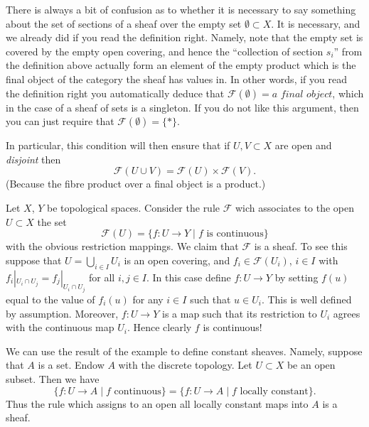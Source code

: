 \begin{remark}
\label{remark-confusion}
There is always a bit of confusion as to whether it is
necessary to say something about the set of sections of
a sheaf over the empty set $\emptyset \subset X$.
It is necessary, and we already did if you read the
definition right. Namely, note that the empty set is
covered by the empty open covering, and hence the ``collection
of section $s_i$'' from the definition above actually form
an element of the empty product which is the final object
of the category the sheaf has values in. In other words,
if you read the definition right you automatically deduce
that $\mathcal{F}(\emptyset) = \textit{a final object}$,
which in the case of a sheaf of sets is a singleton.
If you do not like this argument, then you can just require
that $\mathcal{F}(\emptyset) = \{*\}$.

\medskip\noindent
In particular, this condition will then ensure that if
$U, V \subset X$ are open and {\it disjoint} then
$$
\mathcal{F}(U \cup V) = \mathcal{F}(U) \times \mathcal{F}(V).
$$
(Because the fibre product over a final object is a product.)
\end{remark}

\begin{example}
\label{example-basic-continuous-maps}
Let $X$, $Y$ be topological spaces.
Consider the rule $\mathcal{F}$ wich associates to
the open $U \subset X$ the set
$$
\mathcal{F}(U) = \{ f : U \to Y \mid f \text{ is continuous}\}
$$
with the obvious restriction mappings. We claim that
$\mathcal{F}$ is a sheaf. To see this suppose that
$U = \bigcup_{i\in I} U_i$ is an open covering, and
$f_i \in \mathcal{F}(U_i)$, $i\in I$ with
$f_i |_{U_i \cap U_j} = f_j|_{U_i \cap U_j}$ for all $i,j \in I$.
In this case define $f : U \to Y$ by setting $f(u)$
equal to the value of $f_i(u)$ for any $i \in I$ such that
$u \in U_i$. This is well defined by assumption. Moreover,
$f : U \to Y$ is a map such that its restriction to $U_i$
agrees with the continuous map $U_i$. Hence clearly $f$ is
continuous!
\end{example}

\noindent
We can use the result of the example to define constant
sheaves. Namely, suppose that $A$ is a set. Endow $A$ with
the discrete topology. Let $U \subset X$ be an open subset.
Then we have
$$
\{ f : U \to A \mid f\text{ continuous}\}
=
\{ f : U \to A \mid f\text{ locally constant}\}.
$$
Thus the rule which assigns to an open all locally
constant maps into $A$ is a sheaf.

